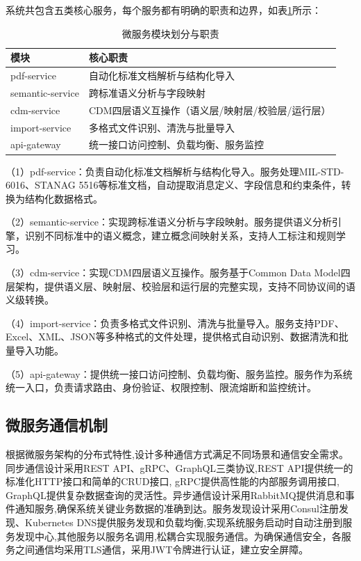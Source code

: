 系统共包含五类核心服务，每个服务都有明确的职责和边界，如表\ref{table:microservices}所示：

\begin{table}[H]
    \caption{微服务模块划分与职责}
    \label{table:microservices}
    \centering
    \begin{tabular}{|l|l|}
        \hline
        \textbf{模块} & \textbf{核心职责} \\
        \hline
        pdf-service & 自动化标准文档解析与结构化导入 \\
        semantic-service & 跨标准语义分析与字段映射 \\
        cdm-service & CDM四层语义互操作（语义层/映射层/校验层/运行层） \\
        import-service & 多格式文件识别、清洗与批量导入 \\
        api-gateway & 统一接口访问控制、负载均衡、服务监控 \\
        \hline
    \end{tabular}
\end{table}

（1）pdf-service：负责自动化标准文档解析与结构化导入。服务处理MIL-STD-6016、STANAG 5516等标准文档，自动提取消息定义、字段信息和约束条件，转换为结构化数据格式。

（2）semantic-service：实现跨标准语义分析与字段映射。服务提供语义分析引擎，识别不同标准中的语义概念，建立概念间映射关系，支持人工标注和规则学习。

（3）cdm-service：实现CDM四层语义互操作。服务基于Common Data Model四层架构，提供语义层、映射层、校验层和运行层的完整实现，支持不同协议间的语义级转换。

（4）import-service：负责多格式文件识别、清洗与批量导入。服务支持PDF、Excel、XML、JSON等多种格式的文件处理，提供格式自动识别、数据清洗和批量导入功能。

（5）api-gateway：提供统一接口访问控制、负载均衡、服务监控。服务作为系统统一入口，负责请求路由、身份验证、权限控制、限流熔断和监控统计。

\subsection{微服务通信机制}

根据微服务架构的分布式特性,设计多种通信方式满足不同场景和通信安全需求。同步通信设计采用REST API、gRPC、GraphQL三类协议,REST API提供统一的标准化HTTP接口和简单的CRUD接口, gRPC提供高性能的内部服务调用接口, GraphQL提供复杂数据查询的灵活性。异步通信设计采用RabbitMQ提供消息和事件通知服务,确保系统关键业务数据的准确到达。服务发现设计采用Consul注册发现、Kubernetes DNS提供服务发现和负载均衡,实现系统服务启动时自动注册到服务发现中心,其他服务以服务名调用,松耦合实现服务通信。为确保通信安全，各服务之间通信均采用TLS通信，采用JWT令牌进行认证，建立安全屏障。

